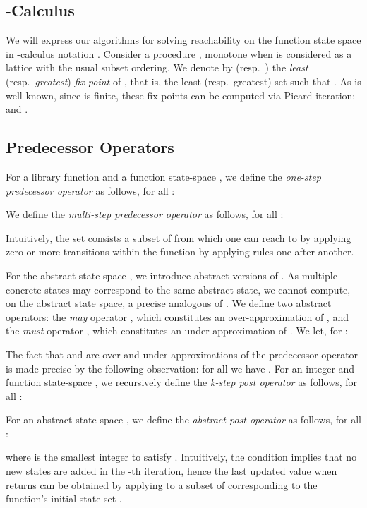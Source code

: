 \documentclass{llncs}
\begin{document}
\subsection{-Calculus}
We will express our algorithms for solving reachability on the function state
space in -calculus notation \cite{EmersonJutla91}. 
Consider a procedure , monotone when  is
considered as a lattice with the usual subset ordering. 
We denote by  (resp.\ ) 
the {\em least\/} (resp.\ {\em greatest\/}) {\em fix-point\/} of
, that is, the least (resp.\ greatest) set  such 
that . 
As is well known, since  is finite, these fix-points can be computed
via Picard iteration: 
 and 
. 


\subsection{Predecessor Operators}
For a library function  and a function state-space ,  
we define the  {\em one-step predecessor operator\/}
 as follows, for all : 

We define the  {\em multi-step predecessor operator\/}
 as follows, for all : 



Intuitively, the set  consists a subset of  from which one can reach to  by applying zero or more transitions within the function  by applying rules one after another.

For the abstract state space , we introduce abstract versions of . 
As multiple concrete states may correspond to the same
abstract state, we cannot compute, on the abstract state space, 
a precise analogous of . 
We define two abstract operators: the {\em may\/} operator , 
which constitutes an over-approximation of , 
and the {\em must\/} operator , 
which constitutes an under-approximation of  \cite{dAGJ-lics04}. 
We let, for : 

The fact that  and  are over and
under-approximations of the predecessor operator is made
precise by the following observation: for all  we have
.
For an integer  and function state-space , 
we recursively define the {\em k-step  post operator\/}
 as follows, for all : 



For an abstract state space , we define the {\em abstract post operator\/}
 as follows, for all : 

where  is the smallest integer to satisfy .
Intuitively, the condition implies that no new states are added in the -th iteration, hence 
the last updated value when  returns can be obtained by applying  to 
a subset of  corresponding to the function's initial state set .
\end{document}
